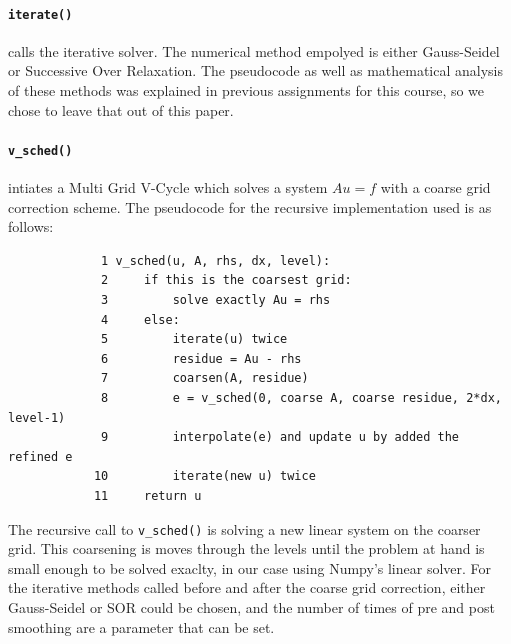 \documentclass[pdftex,12pt,a4paper]{article}
\begin{document}
        \paragraph*{\lstinline{iterate()}}calls the iterative solver. The numerical method empolyed is either Gauss-Seidel or Successive Over Relaxation. The pseudocode as well as mathematical analysis of these methods was explained in previous assignments for this course, so we chose to leave that out of this paper. 

        \paragraph*{\lstinline{v_sched()}} intiates a Multi Grid V-Cycle which solves a system $Au = f$ with a coarse grid correction scheme. The pseudocode for the recursive implementation used is as follows:
        \begin{verbatim}
             1 v_sched(u, A, rhs, dx, level):
             2     if this is the coarsest grid:
             3         solve exactly Au = rhs
             4     else:
             5         iterate(u) twice
             6         residue = Au - rhs
             7         coarsen(A, residue)
             8         e = v_sched(0, coarse A, coarse residue, 2*dx, level-1)
             9         interpolate(e) and update u by added the refined e
            10         iterate(new u) twice                
            11     return u

        \end{verbatim}
        The recursive call to \lstinline{v_sched()} is solving a new linear system on the coarser grid. This coarsening is moves through the levels until the problem at hand is small enough to be solved exaclty, in our case using Numpy's linear solver. For the iterative methods called before and after the coarse grid correction,  either Gauss-Seidel or SOR could be chosen, and the number of times of pre and post smoothing are a parameter that can be set.
\end{document}
